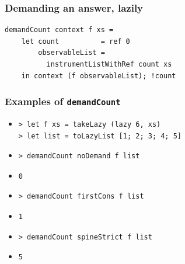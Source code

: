 \documentclass{beamer}
\begin{document}
\begin{frame}[fragile]
\frametitle{Demanding an answer, lazily}
\begin{verbatim}
demandCount context f xs =
    let count          = ref 0
        observableList =
          instrumentListWithRef count xs
    in context (f observableList); !count
\end{verbatim}
\end{frame}


\begin{frame}[fragile]
\frametitle{Examples of \texttt{demandCount}}
\begin{itemize}
\item<1->[]
\begin{verbatim}
> let f xs = takeLazy (lazy 6, xs)
> let list = toLazyList [1; 2; 3; 4; 5]
\end{verbatim}
\item<2->[]
\begin{verbatim}
> demandCount noDemand f list
\end{verbatim}
\item<3->[]
\begin{verbatim}
0
\end{verbatim}
\item<4->[]
\begin{verbatim}
> demandCount firstCons f list
\end{verbatim}
\item<5->[]
\begin{verbatim}
1
\end{verbatim}
\item<6->[]
\begin{verbatim}
> demandCount spineStrict f list
\end{verbatim}
\item<7->[]
\begin{verbatim}
5
\end{verbatim}
\end{itemize}
\end{frame}
\end{document}
